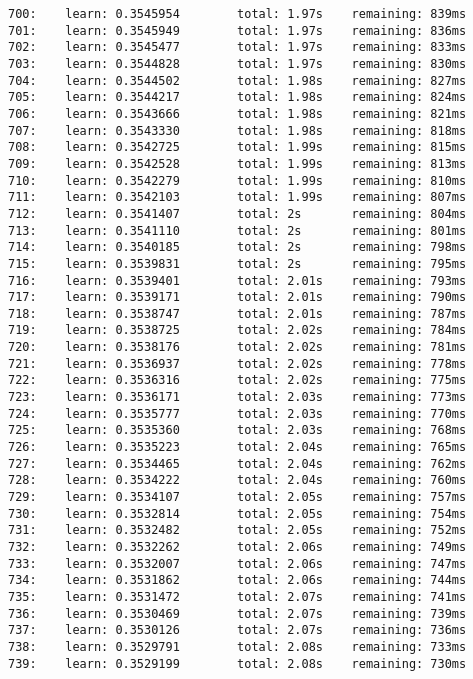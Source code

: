\documentclass[11pt]{article}
\begin{document}
\begin{Verbatim}[commandchars=\\\{\}]
700:    learn: 0.3545954        total: 1.97s    remaining: 839ms
701:    learn: 0.3545949        total: 1.97s    remaining: 836ms
702:    learn: 0.3545477        total: 1.97s    remaining: 833ms
703:    learn: 0.3544828        total: 1.97s    remaining: 830ms
704:    learn: 0.3544502        total: 1.98s    remaining: 827ms
705:    learn: 0.3544217        total: 1.98s    remaining: 824ms
706:    learn: 0.3543666        total: 1.98s    remaining: 821ms
707:    learn: 0.3543330        total: 1.98s    remaining: 818ms
708:    learn: 0.3542725        total: 1.99s    remaining: 815ms
709:    learn: 0.3542528        total: 1.99s    remaining: 813ms
710:    learn: 0.3542279        total: 1.99s    remaining: 810ms
711:    learn: 0.3542103        total: 1.99s    remaining: 807ms
712:    learn: 0.3541407        total: 2s       remaining: 804ms
713:    learn: 0.3541110        total: 2s       remaining: 801ms
714:    learn: 0.3540185        total: 2s       remaining: 798ms
715:    learn: 0.3539831        total: 2s       remaining: 795ms
716:    learn: 0.3539401        total: 2.01s    remaining: 793ms
717:    learn: 0.3539171        total: 2.01s    remaining: 790ms
718:    learn: 0.3538747        total: 2.01s    remaining: 787ms
719:    learn: 0.3538725        total: 2.02s    remaining: 784ms
720:    learn: 0.3538176        total: 2.02s    remaining: 781ms
721:    learn: 0.3536937        total: 2.02s    remaining: 778ms
722:    learn: 0.3536316        total: 2.02s    remaining: 775ms
723:    learn: 0.3536171        total: 2.03s    remaining: 773ms
724:    learn: 0.3535777        total: 2.03s    remaining: 770ms
725:    learn: 0.3535360        total: 2.03s    remaining: 768ms
726:    learn: 0.3535223        total: 2.04s    remaining: 765ms
727:    learn: 0.3534465        total: 2.04s    remaining: 762ms
728:    learn: 0.3534222        total: 2.04s    remaining: 760ms
729:    learn: 0.3534107        total: 2.05s    remaining: 757ms
730:    learn: 0.3532814        total: 2.05s    remaining: 754ms
731:    learn: 0.3532482        total: 2.05s    remaining: 752ms
732:    learn: 0.3532262        total: 2.06s    remaining: 749ms
733:    learn: 0.3532007        total: 2.06s    remaining: 747ms
734:    learn: 0.3531862        total: 2.06s    remaining: 744ms
735:    learn: 0.3531472        total: 2.07s    remaining: 741ms
736:    learn: 0.3530469        total: 2.07s    remaining: 739ms
737:    learn: 0.3530126        total: 2.07s    remaining: 736ms
738:    learn: 0.3529791        total: 2.08s    remaining: 733ms
739:    learn: 0.3529199        total: 2.08s    remaining: 730ms

\end{Verbatim}
\end{document}
